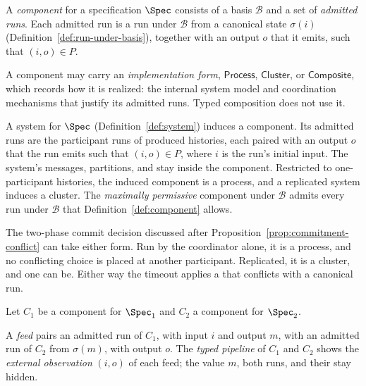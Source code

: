 \begin{definition}
\label{def:component}
A \emph{component} for a specification $\Spec$ consists of a \commitment basis
$\mathcal B$ and a set of \emph{admitted runs}.  Each admitted run is a run
under $\mathcal B$ from a canonical state $\sigma(i)$
(Definition~\ref{def:run-under-basis}), together with an output $o$ that it
emits, such that $(i,o)\in P$.
\end{definition}

\begin{definition}
\label{def:implementation-form}
A component may carry an \emph{implementation form}, $\mathsf{Process}$,
$\mathsf{Cluster}$, or $\mathsf{Composite}$, which records how it is
realized: the internal system model and coordination mechanisms that justify
its admitted runs.  Typed composition does not use it.
\end{definition}

A system for $\Spec$ (Definition~\ref{def:system}) induces a component.  Its
admitted runs are the participant runs of produced histories, each paired
with an output $o$ that the run emits such that $(i,o)\in P$, where $i$ is the
run's initial input.  The system's messages, partitions, and \commitments stay
inside the component.  Restricted to one-participant histories, the induced
component is a process, and a replicated system induces a cluster.  The
\emph{maximally permissive} component under $\mathcal B$ admits every run
under $\mathcal B$ that Definition~\ref{def:component} allows.

The two-phase commit decision discussed after
Proposition~\ref{prop:commitment-conflict} can take either form.  Run by the
coordinator alone, it is a process, and no conflicting choice is placed at
another participant.  Replicated, it is a cluster, and one can be.  Either way
the timeout applies a \commitment that conflicts with a canonical run.

Let $C_1$ be a component for $\Spec_1$ and $C_2$ a component for $\Spec_2$.

\begin{definition}
\label{def:typed-pipeline}
A \emph{feed} pairs an admitted run of $C_1$, with input $i$ and output $m$,
with an admitted run of $C_2$ from $\sigma(m)$, with output $o$.  The
\emph{typed pipeline} of $C_1$ and $C_2$ shows the \emph{external
observation} $(i,o)$ of each feed; the value $m$, both runs, and their
\commitments stay hidden.
\end{definition}

